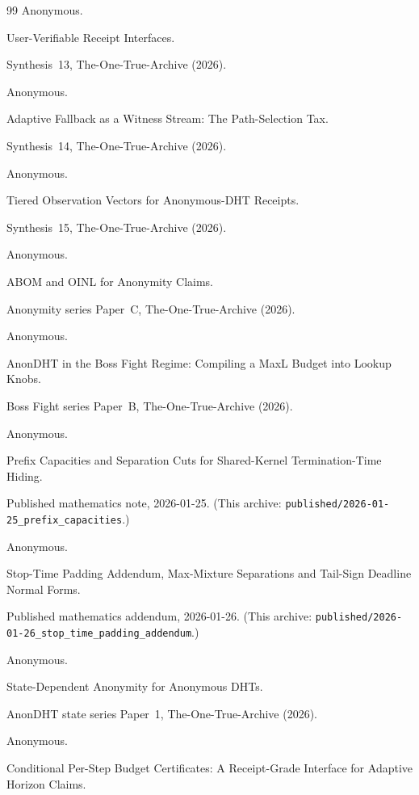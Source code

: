 \documentclass[11pt]{article}
\begin{document}
\begin{thebibliography}{99}
Anonymous.

\newblock User-Verifiable Receipt Interfaces.

\newblock Synthesis~13, The-One-True-Archive (2026).

Anonymous.

\newblock Adaptive Fallback as a Witness Stream: The Path-Selection Tax.

\newblock Synthesis~14, The-One-True-Archive (2026).

Anonymous.

\newblock Tiered Observation Vectors for Anonymous-DHT Receipts.

\newblock Synthesis~15, The-One-True-Archive (2026).

Anonymous.

\newblock ABOM and OINL for Anonymity Claims.

\newblock Anonymity series Paper~C, The-One-True-Archive (2026).

Anonymous.

\newblock AnonDHT in the Boss Fight Regime: Compiling a MaxL Budget into Lookup Knobs.

\newblock Boss Fight series Paper~B, The-One-True-Archive (2026).


Anonymous.

\newblock Prefix Capacities and Separation Cuts for Shared-Kernel Termination-Time Hiding.

\newblock Published mathematics note, 2026-01-25. (This archive: \texttt{published/2026-01-25\_prefix\_capacities}.)

Anonymous.

\newblock Stop-Time Padding Addendum, Max-Mixture Separations and Tail-Sign Deadline Normal Forms.

\newblock Published mathematics addendum, 2026-01-26. (This archive: \texttt{published/2026-01-26\_stop\_time\_padding\_addendum}.)

Anonymous.

\newblock State-Dependent Anonymity for Anonymous DHTs.

\newblock AnonDHT state series Paper~1, The-One-True-Archive (2026).

Anonymous.

\newblock Conditional Per-Step Budget Certificates: A Receipt-Grade Interface for Adaptive Horizon Claims.


\end{thebibliography}
\end{document}
